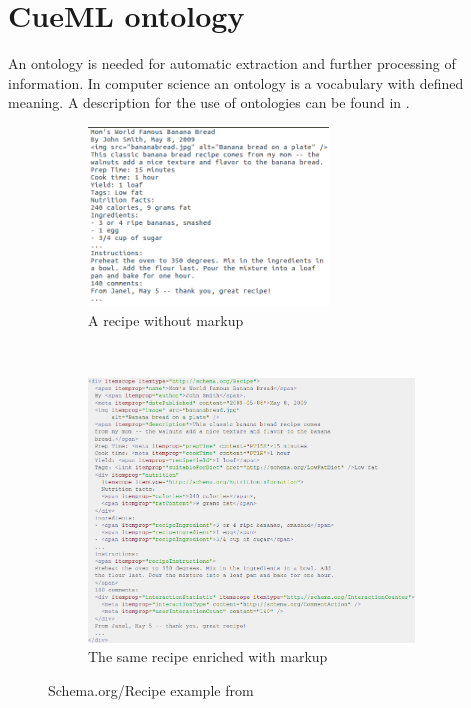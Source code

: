 \documentclass[12pt, twoside]{report}
\begin{document}
\section{CueML ontology}\label{sec:cueMLOntology}
An ontology is needed for automatic extraction and further processing of information. In computer science an ontology is a vocabulary with defined meaning. A description for the use of ontologies can be found in \parencite{semanticWeb}.

\begin{figure}
	\begin{subfigure}{1\textwidth}
		\centering
		\includegraphics[width=0.7\textwidth]{Images/schemaRecipeWithoutMarkup}
		\caption{A recipe without markup}
	\end{subfigure} \\
	\begin{subfigure}{1\textwidth}
		\centering
		\includegraphics[width=0.95\textwidth]{Images/schemaRecipeWithMarkup}
		\caption{The same recipe enriched with markup}
	\end{subfigure}
	\caption{Schema.org/Recipe example from \parencite{schemaOrg}}
	\label{fig:schemaOrgRecipe}
\end{figure}
\end{document}
